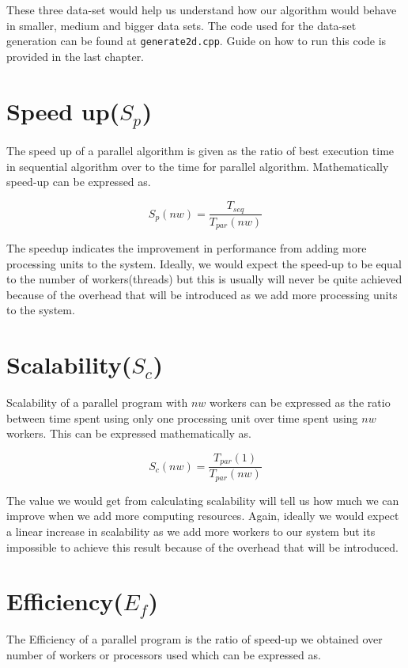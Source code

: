 \documentclass[12pt,a4paper]{report}
\begin{document}
These three data-set would help us understand how our algorithm would behave in smaller, medium and bigger data sets. The code used for the data-set generation can be found at \verb!generate2d.cpp!.  Guide on how to run this code is provided in the last chapter.

\section{Speed up($S_p$)}
The speed up of a parallel algorithm is given as the ratio of best execution time in sequential algorithm over to the time for parallel algorithm. Mathematically speed-up can be expressed as.

\begin{equation}
S_p(nw) = \frac{T_{seq}}{T_{par}(nw)} 
\end{equation}

The speedup indicates the improvement in performance from adding more processing units to the system. Ideally, we would expect the speed-up to be equal to the number of workers(threads) but this is usually will never be quite achieved because of the overhead that will be introduced as we add more processing units to the system.

\section{Scalability($S_c$)}
Scalability of a parallel program with $nw$ workers can be expressed as the ratio between time spent using only one processing unit over time spent using $nw$ workers. This can be expressed mathematically as.

\begin{equation}
S_c(nw) = \frac{T_{par}(1)}{T_{par}(nw)} 
\end{equation}

The value we would get from calculating scalability will tell us how much we can improve when we add more computing resources. Again, ideally we would expect a linear increase in scalability as we add more workers to our system but its impossible to achieve this result because of the overhead that will be introduced.

\section{Efficiency($E_f$)}
The Efficiency of a parallel program is the ratio of speed-up we obtained over number of workers or processors used which can be expressed as.
\end{document}
